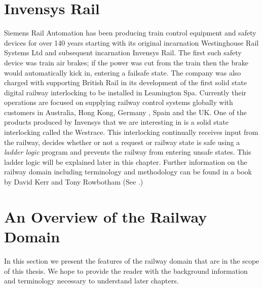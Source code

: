 \section{Invensys Rail}

Siemens Rail Automation \cite{Siemens} has been producing train control equipment and safety devices for over 140 years starting with its original incarnation Westinghouse Rail Systems Ltd and subsequent incarnation Invensys Rail. 
The first such safety device was train air brakes; if the power was cut from the train then the brake would automatically kick in, entering a failsafe state. The company was also charged with supporting British Rail in its development of the first solid state digital railway interlocking to be installed in Leamington Spa. Currently their operations are focused on supplying railway control systems globally with customers in Australia, Hong Kong, Germany , Spain and the UK. One of the products produced by Invensys that we are interesting in is  a solid state interlocking called the Westrace. This interlocking continually receives input from the railway, decides whether or not a request or railway state is safe using a \emph{ladder logic} program and prevents the railway from entering unsafe states. This ladder logic will be explained later in this chapter. Further information on the railway domain including terminology and methodology can be found in a book by David Kerr and Tony Rowbotham (See \cite{KR01}.)
\begin{comment}

Originally they produced air brakes for trains, these had a
failsafe state such that if the power was cut the brakes would automatically stop the train.
Later on in the company's development they provided support to British Rail
when the first solid state digital railway interlocking was installed in
Leamington Spa. Today they supply railway control equipment to companies based
around the globe, including companies based in Australia, Hong Kong,
Germany, Spain and the UK. This project is mainly concerned with one of the
solid state railway interlockings Invensys produces called the Westrace. The
Westrace railway interlocking continuously runs a ladder logic program which
prevents the railway control systems from entering a dangerous state. Ladder
logic will be explained in a later chapter.
David Kerr and Tony Rowbotham  produced a book that explains the
terminology and methodology used in the railway industry and by
Invensys (See \cite{KR01}).  
\end{comment}
\section{An Overview of the Railway Domain} 
In this section we present the features of the railway domain that are in
the scope of this thesis. We hope to provide the reader with the background
information and terminology necessary to understand later chapters.


